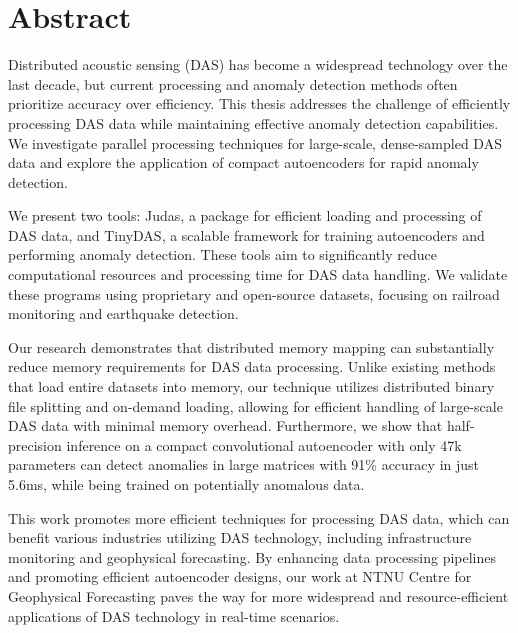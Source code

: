 \chapter*{Abstract}
Distributed acoustic sensing (DAS) has become a widespread technology over the last decade, but current processing and anomaly detection methods often prioritize accuracy over efficiency. This thesis addresses the challenge of efficiently processing DAS data while maintaining effective anomaly detection capabilities. We investigate parallel processing techniques for large-scale, dense-sampled DAS data and explore the application of compact autoencoders for rapid anomaly detection.

We present two tools: Judas, a package for efficient loading and processing of DAS data, and TinyDAS, a scalable framework for training autoencoders and performing anomaly detection. These tools aim to significantly reduce computational resources and processing time for DAS data handling. We validate these programs using proprietary and open-source datasets, focusing on railroad monitoring and earthquake detection.

Our research demonstrates that distributed memory mapping can substantially reduce memory requirements for DAS data processing. Unlike existing methods that load entire datasets into memory, our technique utilizes distributed binary file splitting and on-demand loading, allowing for efficient handling of large-scale DAS data with minimal memory overhead. Furthermore, we show that half-precision inference on a compact convolutional autoencoder with only 47k parameters can detect anomalies in large matrices with 91\% accuracy in just 5.6ms, while being trained on potentially anomalous data.

This work promotes more efficient techniques for processing DAS data, which can benefit various industries utilizing DAS technology, including infrastructure monitoring and geophysical forecasting. By enhancing data processing pipelines and promoting efficient autoencoder designs, our work at NTNU Centre for Geophysical Forecasting paves the way for more widespread and resource-efficient applications of DAS technology in real-time scenarios.
